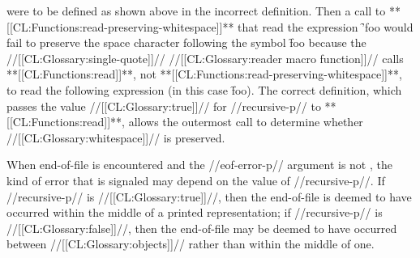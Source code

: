 were to be defined as shown above in the incorrect definition.
Then a call to **[[CL:Functions:read-preserving-whitespace]]**
that read the expression \f{'foo\SpaceChar} would fail to preserve the space
character following the symbol \f{foo} because the //[[CL:Glossary:single-quote]]//
//[[CL:Glossary:reader macro function]]// calls **[[CL:Functions:read]]**, 
not **[[CL:Functions:read-preserving-whitespace]]**,
to read the following expression (in this case \f{foo}).
The correct definition, which passes the value //[[CL:Glossary:true]]// for //recursive-p//
to **[[CL:Functions:read]]**, allows the outermost call to determine
whether //[[CL:Glossary:whitespace]]// is preserved.


When end-of-file is encountered and the //eof-error-p// argument
is not \nil, the kind of error that is signaled may depend on the value
of //recursive-p//.  If //recursive-p// 
is //[[CL:Glossary:true]]//, then the end-of-file
is deemed to have occurred within the middle of a printed representation;
if //recursive-p// is //[[CL:Glossary:false]]//, then the end-of-file may be deemed to have
occurred between //[[CL:Glossary:objects]]// rather than within the middle of one.

\endlist

\endsubsubsection%

\endsubsection%
